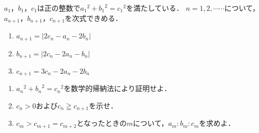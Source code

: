 \documentclass[../../main.tex]{subfiles}
\begin{document}
$a_1$，$b_1$，$c_1$は正の整数で${a_1}^2+{b_1}^2={c_1}^2$を満たしている．
$n=1,2,\cdots\cdots$について，$a_{n+1}$，$b_{n+1}$，$c_{n+1}$を次式できめる．
\begin{enumerate}
  \item []$a_{n+1}=|2c_n-a_n-2b_n|$
  \item []$b_{n+1}=|2c_n-2a_n-b_n|$
  \item []$c_{n+1}=3c_n-2a_n-2b_n$
\end{enumerate}
\begin{enumerate}
  \item ${a_n}^2+{b_n}^2={c_n}^2$を数学的帰納法により証明せよ．
  \item $c_n>0$および$c_n \geqq c_{n+1}$を示せ．
  \item $c_m>c_{m+1}=c_{m+2}$となったときの$m$について，$a_m:b_m:c_m$を求めよ．
\end{enumerate}
\end{document}
